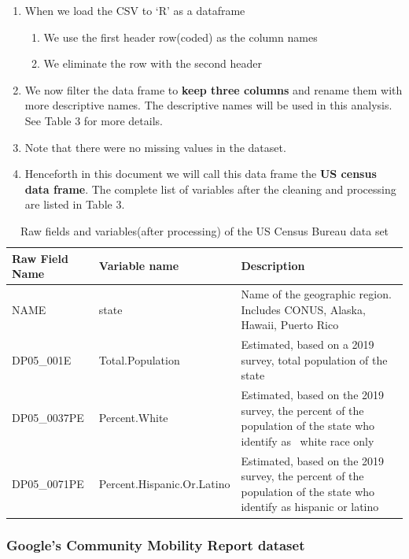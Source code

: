 \documentclass[
]{article}
\providecommand{\tightlist}{%
  \setlength{\itemsep}{0pt}\setlength{\parskip}{0pt}}
\begin{document}
\begin{enumerate}
\def\labelenumi{\arabic{enumi}.}
\tightlist
\item
  When we load the CSV to `R' as a dataframe

  \begin{enumerate}
  \def\labelenumii{\alph{enumii}.}
  \tightlist
  \item
    We use the first header row(coded) as the column names
  \item
    We eliminate the row with the second header
  \end{enumerate}
\item
  We now filter the data frame to \textbf{keep three columns} and rename
  them with more descriptive names. The descriptive names will be used
  in this analysis. See Table 3 for more details.
\item
  Note that there were no missing values in the dataset.
\item
  Henceforth in this document we will call this data frame the
  \textbf{US census data frame}. The complete list of variables after
  the cleaning and processing are listed in Table 3.
\end{enumerate}

\begin{table}[!h]

\caption{\label{tab:census_raw}Raw fields and variables(after processing) of the US Census Bureau data set}
\centering
\begin{tabular}[t]{l|l|>{\raggedright\arraybackslash}p{8.3cm}}
\hline
Raw Field Name & Variable name & Description\\
\hline
NAME & state & Name of the geographic region. Includes CONUS, Alaska, Hawaii, Puerto Rico\\
\hline
DP05\_001E & Total.Population & Estimated, based on a 2019 survey, total population of the state\\
\hline
DP05\_0037PE & Percent.White & Estimated, based on the 2019 survey, the percent of the population of the state who identify as  white race only \\
\hline
DP05\_0071PE & Percent.Hispanic.Or.Latino & Estimated, based on the 2019 survey, the percent of the population of the state who identify as hispanic or latino \\
\hline
\end{tabular}
\end{table}

\hypertarget{googles-community-mobility-report-dataset}{%
\subsubsection{Google's Community Mobility Report
dataset}\label{googles-community-mobility-report-dataset}}
\end{document}
